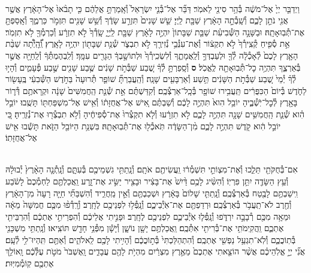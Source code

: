 \documentclass[twoside, openany, parskip=half, 11pt]{book}
\begin{document}
\begin{footnotesize}
\begin{multicols}{2}
\\
וַיְדַבֵּ֤ר יְיָ֙ אֶל־מֹשֶׁ֔ה בְּ֯הַ֥ר סִינַ֖י לֵאמֹֽר׃ דַּבֵּ֞ר אֶל־בְּ֯נֵ֤י יִשְׂרָאֵל֙ וְ֯אָֽמַרְתָּ֣ אֲלֵהֶ֔ם כִּ֤י תָבֹ֨אוּ֙ אֶל־הָאָ֔רֶץ אֲשֶׁ֥ר אֲנִ֖י נֹתֵ֣ן לָכֶ֑ם וְ֯שָֽׁבְ֯תָ֣ה הָאָ֔רֶץ שַׁבָּ֖ת לַֽיְיָ׃ שֵׁ֤שׁ שָׁנִים֙ תִּזְרַ֣ע שָׂדֶ֔ךָ וְ֯שֵׁ֥שׁ שָׁנִ֖ים תִּזְמֹ֣ר כַּרְמֶ֑ךָ וְ֯אָֽסַפְתָּ֖ אֶת־תְּ֯בֽוּאָתָֽהּ׃  וּבַשָּׁנָ֣ה הַשְּׁ֯בִיעִ֗ת שַׁבַּ֤ת שַׁבָּתוֹן֙ יִהְיֶ֣ה לָאָ֔רֶץ שַׁבָּ֖ת לַֽיְיָ֑ שָֽׂדְ֯ךָ֙ לֹ֣א תִזְרָ֔ע וְ֯כַרְמְ֯ךָ֖ לֹ֥א תִזְמֹֽר׃ אֵ֣ת סְ֯פִ֤יחַ קְ֯צִֽירְ֯ךָ֙ לֹ֣א תִקְצ֔וֹר וְ֯אֶת־עִנְּ֯בֵ֥י נְ֯זִירֶ֖ךָ לֹ֣א תִבְצֹ֑ר שְׁ֯נַ֥ת שַׁבָּת֖וֹן יִהְיֶ֥ה לָאָֽרֶץ׃ וְֽ֠֯הָֽיְ֯תָ֠ה שַׁבַּ֨ת הָאָ֤רֶץ לָכֶם֙ לְ֯אָכְ֯לָ֔ה לְ֯ךָ֖ וּלְעַבְדְּךָ֣ וְ֯לַֽאֲמָתֶ֑ךָ וְ֯לִשְׂכִֽירְ֯ךָ֙ וּלְתוֹשָׁ֣בְךָ֔ הַגָּרִ֖ים עִמָּֽךְ׃ וְ֯לִֽבְהֶמְתְּ֯ךָ֔ וְ֯לַֽחַיָּ֖ה אֲשֶׁ֣ר בְּ֯אַרְצֶ֑ךָ תִּהְיֶ֥ה כׇל־תְּ֯בֽוּאָתָ֖הּ לֶֽאֱכֹֽל׃ \textbf{ס}  וְ֯סָֽפַרְתָּ֣ לְ֯ךָ֗ שֶׁ֚בַע שַׁבְּ֯תֹ֣ת שָׁנִ֔ים שֶׁ֥בַע שָׁנִ֖ים שֶׁ֣בַע פְּ֯עָמִ֑ים וְ֯הָי֣וּ לְ֯ךָ֗ יְ֯מֵי֙ שֶׁ֚בַע שַׁבְּ֯תֹ֣ת הַשָּׁנִ֔ים תֵּ֥שַׁע וְ֯אַרְבָּעִ֖ים שָׁנָֽה׃ וְ֯הַֽעֲבַרְתָּ֞ שׁוֹפַ֤ר תְּ֯רוּעָה֙ בַּחֹ֣דֶשׁ הַשְּׁ֯בִעִ֔י בֶּֽעָשׂ֖וֹר לַחֹ֑דֶשׁ בְּ֯יוֹם֙ הַכִּפֻּרִ֔ים תַּֽעֲבִ֥ירוּ שׁוֹפָ֖ר בְּ֯כָֽל־אַרְצְ֯כֶֽם׃ וְ֯קִדַּשְׁתֶּ֗ם אֵ֣ת שְׁ֯נַ֤ת הַֽחֲמִשִּׁים֙ שָׁנָ֔ה וּקְרָאתֶ֥ם דְּ֯ר֛וֹר בָּאָ֖רֶץ לְ֯כׇל־יֹֽשְׁ֯בֶ֑יהָ יוֹבֵ֥ל הִוא֙ תִּהְיֶ֣ה לָכֶ֔ם וְ֯שַׁבְתֶּ֗ם אִ֚ישׁ אֶל־אֲחֻזָּת֔וֹ וְ֯אִ֥ישׁ אֶל־מִשְׁפַּחְתּ֖וֹ תָּשֻֽׁבוּ׃ יוֹבֵ֣ל הִ֗וא שְׁ֯נַ֛ת הַֽחֲמִשִּׁ֥ים שָׁנָ֖ה תִּהְיֶ֣ה לָכֶ֑ם לֹ֣א תִזְרָ֔עוּ וְ֯לֹ֤א תִקְצְ֯רוּ֙ אֶת־סְ֯פִיחֶ֔יהָ וְ֯לֹ֥א תִבְצְ֯ר֖וּ אֶת־נְ֯זִרֶֽיהָ׃ כִּ֚י יוֹבֵ֣ל הִ֔וא קֹ֖דֶשׁ תִּהְיֶ֣ה לָכֶ֑ם מִ֨ן־הַשָּׂדֶ֔ה תֹּֽאכְ֯ל֖וּ אֶת־תְּ֯בֽוּאָתָֽהּ׃ בִּשְׁנַ֥ת הַיּוֹבֵ֖ל הַזֹּ֑את תָּשֻׁ֕בוּ אִ֖ישׁ אֶל־אֲחֻזָּתֽוֹ׃


\\
אִם־בְּ֯חֻקֹּתַ֖י תֵּלֵ֑כוּ וְ֯אֶת־מִצְוֹתַ֣י תִּשְׁמְ֯ר֔וּ וַֽעֲשִׂיתֶ֖ם אֹתָֽם׃ וְ֯נָֽתַתִּ֥י גִשְׁמֵיכֶ֖ם בְּ֯עִתָּ֑ם וְ֯נָֽתְ֯נָ֤ה הָאָ֨רֶץ֙ יְ֯בוּלָ֔הּ וְ֯עֵ֥ץ הַשָּׂדֶ֖ה יִתֵּ֥ן פִּרְיֽוֹ׃ וְ֯הִשִּׂ֨יג לָכֶ֥ם דַּ֨יִשׁ֙ אֶת־בָּצִ֔יר וּבָצִ֖יר יַשִּׂ֣יג אֶת־זָ֑רַע וַֽאֲכַלְתֶּ֤ם לַחְמְ֯כֶם֙ לָשֹׂ֔בַע וִֽישַׁבְתֶּ֥ם לָבֶ֖טַח בְּ֯אַרְצְ֯כֶֽם׃  וְ֯נָֽתַתִּ֤י שָׁלוֹם֙ בָּאָ֔רֶץ וּשְׁכַבְתֶּ֖ם וְ֯אֵ֣ין מַֽחֲרִ֑יד וְ֯הִשְׁבַּתִּ֞י חַיָּ֤ה רָעָה֙ מִן־הָאָ֔רֶץ וְ֯חֶ֖רֶב לֹא־תַֽעֲבֹ֥ר בְּ֯אַרְצְ֯כֶֽם׃ וּרְדַפְתֶּ֖ם אֶת־אֹֽיְ֯בֵיכֶ֑ם וְ֯נָֽפְ֯ל֥וּ לִפְנֵיכֶ֖ם לֶחָֽרֶב׃ וְ֯רָֽדְ֯פ֨וּ מִכֶּ֤ם חֲמִשָּׁה֙ מֵאָ֔ה וּמֵאָ֥ה מִכֶּ֖ם רְ֯בָבָ֣ה יִרְדֹּ֑פוּ וְ֯נָֽפְ֯ל֧וּ אֹֽיְ֯בֵיכֶ֛ם לִפְנֵיכֶ֖ם לֶחָֽרֶב׃ וּפָנִ֣יתִי אֲלֵיכֶ֔ם וְ֯הִפְרֵיתִ֣י אֶתְכֶ֔ם וְ֯הִרְבֵּיתִ֖י אֶתְכֶ֑ם וַֽהֲקִֽימֹתִ֥י אֶת־בְּ֯רִיתִ֖י אִתְּ֯כֶֽם׃  וַֽאֲכַלְתֶּ֥ם יָשָׁ֖ן נוֹשָׁ֑ן וְ֯יָשָׁ֕ן מִפְּ֯נֵ֥י חָדָ֖שׁ תּוֹצִֽיאוּ׃ וְ֯נָֽתַתִּ֥י מִשְׁכָּנִ֖י בְּ֯תֽוֹכֲכֶ֑ם וְ֯לֹֽא־תִגְעַ֥ל נַפְשִׁ֖י אֶתְכֶֽם׃ וְ֯הִתְהַלַּכְתִּי֙ בְּ֯ת֣וֹכֲכֶ֔ם וְ֯הָיִ֥יתִי לָכֶ֖ם לֵֽאלֹהִ֑ים וְ֯אַתֶּ֖ם תִּֽהְיוּ־לִ֥י לְ֯עָֽם׃ אֲנִ֞י יְיָ֣ אֱלֹֽהֵיכֶ֗ם אֲשֶׁ֨ר הוֹצֵ֤אתִי אֶתְכֶם֙ מֵאֶ֣רֶץ מִצְרַ֔יִם מִהְיֹ֥ת לָהֶ֖ם עֲבָדִ֑ים וָֽאֶשְׁבֹּר֙ מֹטֹ֣ת עֻלְּ֯כֶ֔ם וָֽאוֹלֵ֥ךְ אֶתְכֶ֖ם קֽוֹמְ֯מִיּֽוּת׃


\end{multicols}
\end{footnotesize}
\end{document}
